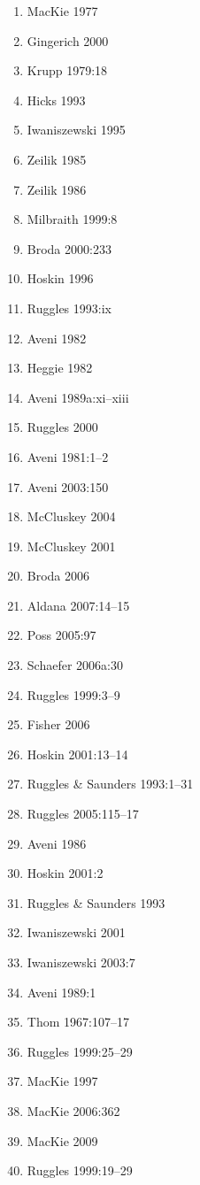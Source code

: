 \begin{enumerate}
    \item MacKie 1977
    \item Gingerich 2000
    \item Krupp 1979:18
    \item Hicks 1993
    \item Iwaniszewski 1995
    \item Zeilik 1985
    \item Zeilik 1986
    \item Milbraith 1999:8
    \item Broda 2000:233
    \item Hoskin 1996
    \item Ruggles 1993:ix
    \item Aveni 1982
    \item Heggie 1982
    \item Aveni 1989a:xi–xiii
    \item Ruggles 2000
    \item Aveni 1981:1–2
    \item Aveni 2003:150
    \item McCluskey 2004
    \item McCluskey 2001
    \item Broda 2006
    \item Aldana 2007:14–15
    \item Poss 2005:97
    \item Schaefer 2006a:30
    \item Ruggles 1999:3–9
    \item Fisher 2006
    \item Hoskin 2001:13–14
    \item Ruggles \& Saunders 1993:1–31
    \item Ruggles 2005:115–17
    \item Aveni 1986
    \item Hoskin 2001:2
    \item Ruggles \& Saunders 1993
    \item Iwaniszewski 2001
    \item Iwaniszewski 2003:7
    \item Aveni 1989:1
    \item Thom 1967:107–17
    \item Ruggles 1999:25–29
    \item MacKie 1997
    \item MacKie 2006:362
    \item MacKie 2009
    \item Ruggles 1999:19–29

\end{enumerate}
